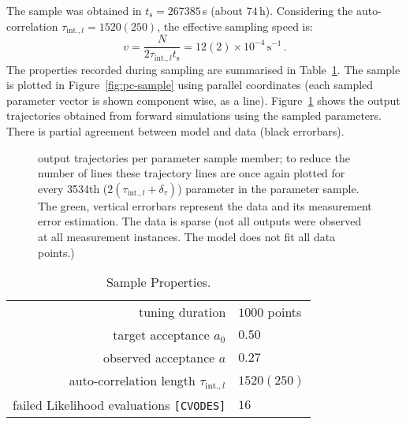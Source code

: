 \documentclass[english]{scrartcl}
\begin{document}
The sample was obtained in $t_{\text{s}}=267385$\,s (about
$74$\,h). Considering the auto-correlation
$\tau_{\text{int.},l}=1520(250)$, the effective sampling speed is:
\begin{equation}
  \label{eq:speed}
  v=\frac{N}{2\tau_{\text{int.},l} t_{\text{s}}}=12(2)\times 10^{-4}\,\text{s}^{-1}\,.
\end{equation}
The properties recorded during sampling are summarised in
Table~\ref{tab:sp}. The sample is plotted in
Figure~\ref{fig:pc-sample} using parallel coordinates (each sampled
parameter vector is shown component wise, as a
line). Figure~\ref{fig:osmpl} shows the output trajectories obtained
from forward simulations using the sampled parameters. There is
partial agreement between model and data (black errorbars).
\begin{figure}
  \sffamily\tiny
  \hspace*{-3cm}
  \caption{output trajectories per parameter sample member;
    to reduce the number of lines these trajectory lines are once
    again plotted for every 3534th
    ($2(\tau_{\text{int.},l}+\delta_\tau)$) parameter in the parameter
    sample. The green, vertical errorbars represent the data and its
    measurement error estimation. The data is sparse (not all outputs
    were observed at all measurement instances. The model does not fit
    all data points.)\label{fig:osmpl}}
\end{figure}

\begin{table}
  \centering
  \begin{tabular}{rl}
    \toprule
    tuning duration& $1000$ points\\
    target acceptance $a_0$&$0.50$\\
    observed acceptance $a$&$0.27$\\
    auto-correlation length $\tau_{\text{int.},l}$&$1520(250)$\\
    failed Likelihood evaluations \texttt{[CVODES]}&$16$\\
    \bottomrule
  \end{tabular}
  \caption{Sample Properties.\label{tab:sp}}
\end{table}
\end{document}
